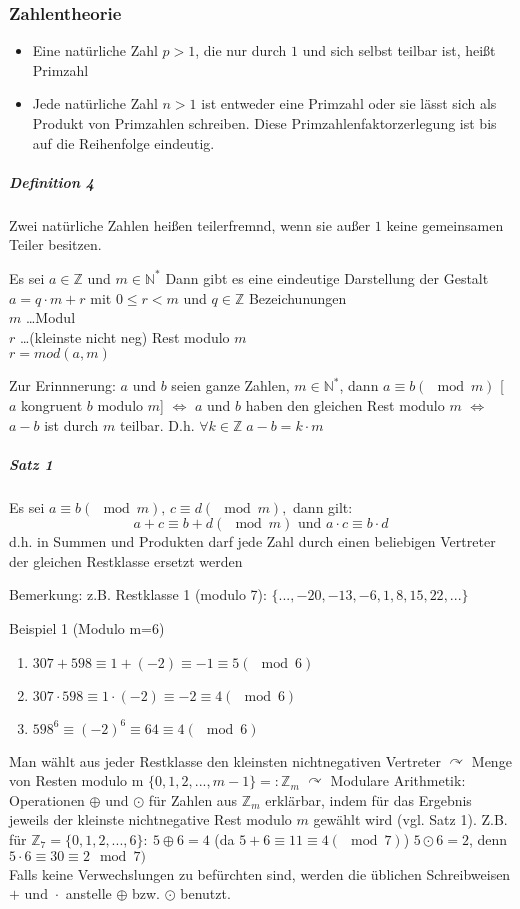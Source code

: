 \documentclass[a4paper]{scrartcl}
\begin{document}
\subsubsection{Zahlentheorie}
\begin{itemize}
\item Eine natürliche Zahl $p>1$, die nur durch $1$ und sich selbst teilbar ist, heißt Primzahl
\item Jede natürliche Zahl $n>1$ ist entweder eine Primzahl oder sie lässt sich als Produkt von Primzahlen schreiben. Diese Primzahlenfaktorzerlegung ist bis auf die Reihenfolge eindeutig.
\end{itemize}
\subparagraph{Definition 4} Zwei natürliche Zahlen heißen teilerfremnd, wenn sie außer $1$ keine gemeinsamen Teiler besitzen.

Es sei $a \in \mathbb{Z}$ und $m \in \mathbb{N}^*$ Dann gibt es eine eindeutige Darstellung der Gestalt
$a=q \cdot m +r$ mit $0\leq r <m$ und $q \in \mathbb{Z}$
Bezeichunungen\\
$m$ \dots Modul\\
$r$ \dots (kleinste nicht neg) Rest modulo $m$\\
$r = mod(a,m)$

Zur Erinnnerung: $a$ und $b$ seien ganze Zahlen, $m \in \mathbb{N}^*$, dann $a \equiv b ( \mod{m})$ [ $a$ kongruent $b$ modulo $m$]
$\Leftrightarrow$ $a$ und $b$ haben den gleichen Rest modulo $m$ $\Leftrightarrow$ $a - b$ ist durch $m$ teilbar. D.h. $\forall k \in \mathbb{Z} \; a-b = k \cdot m$

\subparagraph{Satz 1} Es sei $a \equiv b(\mod{m}),\, c\equiv d(\mod{m}),$ dann gilt:
\[a+c \equiv b+d (\mod{m}) \text{ und } a\cdot c \equiv b \cdot d\]
d.h. in Summen und Produkten darf jede Zahl durch einen beliebigen Vertreter der gleichen Restklasse ersetzt werden

Bemerkung: z.B. Restklasse 1 (modulo 7): $\{...,-20,-13,-6,1,8,15,22,...\}$

Beispiel 1 (Modulo m=6)
\begin{enumerate}
\item $307 + 598 \equiv 1 + (-2) \equiv -1 \equiv 5 (\mod{6})$
\item $307 \cdot 598 \equiv 1 \cdot (-2) \equiv -2 \equiv 4 (\mod{6})$
\item $598^6 \equiv (-2)^6 \equiv 64 \equiv 4 (\mod{6})$
\end{enumerate}

Man wählt aus jeder Restklasse den kleinsten nichtnegativen Vertreter $\curvearrowright$ Menge von Resten modulo m $\{0,1,2,...,m-1\}=:\mathbb{Z}_m$
$\curvearrowright$ Modulare Arithmetik: Operationen $\oplus$ und $\odot$ für Zahlen aus $\mathbb{Z}_m$ erklärbar, indem für das Ergebnis jeweils der kleinste nichtnegative Rest modulo $m$ gewählt wird (vgl. Satz 1). Z.B. für $\mathbb{Z}_7 = \{0,1,2,...,6\} : \: 5 \oplus 6 = 4$ (da $5+6 \equiv 11 \equiv 4 (\mod{7})$) $5 \odot 6 =2$, denn $5\cdot 6 \equiv 30 \equiv 2\mod{7})$\\
Falls keine Verwechslungen zu befürchten sind, werden die üblichen Schreibweisen $+ \text{ und } \cdot$ anstelle $\oplus$ bzw. $\odot$ benutzt.
\end{document}
